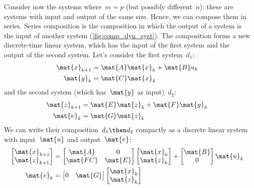 Consider now the systems where~$m=p$ (but possibly different~$n$): these are systems with input and output of the same size.
Hence, we can compose them in series.
Series composition is the composition in which the output of a system is the input of another system (\cref{fig:comp_dyn_syst}).
The composition forms a new discrete-time linear system, which has the input of the first system and the output of the second system.
Let's consider the first system~$d_1$:
\begin{equation*}
  \label{eq:dlin-1}
  \begin{aligned}
    \mat{x}_{k+1} &= \mat{A} \mat{x}_k + \mat{B} u_k \\
    \mat{y}_{k}   &= \mat{C} \mat{x}_k
  \end{aligned}
\end{equation*}
and the second system (which has~$\mat{y}$ as input)~$d_2$:
\begin{equation*}
  \label{eq:dlin-2}
  \begin{aligned}
    \mat{z}_{k+1} &= \mat{E} \mat{z}_k + \mat{F} \mat{y}_k \\
    \mat{v}_{k}   &= \mat{G} \mat{z}_k
  \end{aligned}
\end{equation*}
We can write their composition~$d_1\then d_2$ compactly as a discrete linear system with input~$\mat{u}$ and output~$\mat{v}$:
\begin{equation*}
  \label{eq:dlin-3}
  \begin{aligned}
    \begin{bmatrix}
      \mat{x}_{k+1}\\
      \mat{z}_{k+1}
    \end{bmatrix}&=
    \begin{bmatrix}
      \mat{A}&0\\
      \mat{FC}&\mat{E}
    \end{bmatrix}\begin{bmatrix}
                   \mat{x}_k\\ \mat{z}_k
    \end{bmatrix}+
    \begin{bmatrix}
      \mat{B}\\ 0
    \end{bmatrix}\mat{u}_k\\
    \mat{v}_k&=\begin{bmatrix} 0&\mat{G}\end{bmatrix} \begin{bmatrix} \mat{x}_k \\ \mat{z}_k\end{bmatrix}
  \end{aligned}
\end{equation*}



